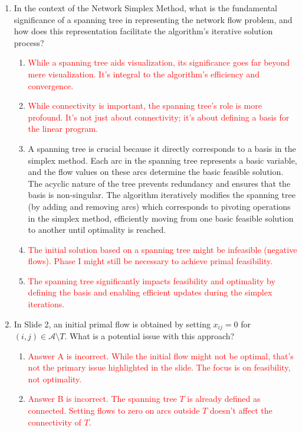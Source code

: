 \documentclass{article}%
\newcommand{\incorrect}[1]{\textcolor{red}{#1}}
\begin{document}
\begin{enumerate}
\vspace{1em}%
\item In the context of the Network Simplex Method, what is the fundamental significance of a spanning tree in representing the network flow problem, and how does this representation facilitate the algorithm's iterative solution process?%
\begin{enumerate}%
\item \incorrect{While a spanning tree aids visualization, its significance goes far beyond mere visualization. It's integral to the algorithm's efficiency and convergence.}%
\item \incorrect{While connectivity is important, the spanning tree's role is more profound. It's not just about connectivity; it's about defining a basis for the linear program.}%
\item A spanning tree is crucial because it directly corresponds to a basis in the simplex method.  Each arc in the spanning tree represents a basic variable, and the flow values on these arcs determine the basic feasible solution.  The acyclic nature of the tree prevents redundancy and ensures that the basis is non-singular.  The algorithm iteratively modifies the spanning tree (by adding and removing arcs) which corresponds to pivoting operations in the simplex method, efficiently moving from one basic feasible solution to another until optimality is reached.%
\item \incorrect{The initial solution based on a spanning tree might be infeasible (negative flows). Phase I might still be necessary to achieve primal feasibility.}%
\item \incorrect{The spanning tree significantly impacts feasibility and optimality by defining the basis and enabling efficient updates during the simplex iterations.}%
\end{enumerate}%
\vspace{1em}%
\item In Slide 2, an initial primal flow is obtained by setting $x_{ij} = 0$ for $(i, j) \in \mathcal{A} \setminus T$. What is a potential issue with this approach?%
\begin{enumerate}%
\item \incorrect{Answer A is incorrect. While the initial flow might not be optimal, that's not the primary issue highlighted in the slide. The focus is on feasibility, not optimality.}%
\item \incorrect{Answer B is incorrect. The spanning tree $T$ is already defined as connected. Setting flows to zero on arcs outside $T$ doesn't affect the connectivity of $T$.}%

\end{enumerate}
\end{enumerate}
\end{document}
